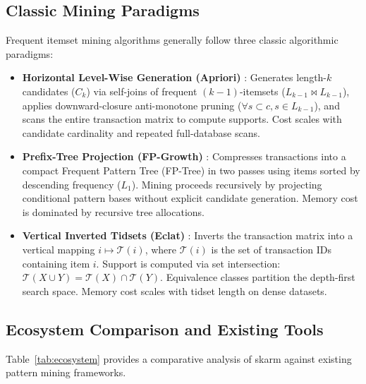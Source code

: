 \documentclass[twocolumn,10pt]{article}
\newcommand{\skarm}{\textsf{skarm}\xspace}
\begin{document}
\subsection{Classic Mining Paradigms}
Frequent itemset mining algorithms generally follow three classic algorithmic paradigms:
\begin{itemize}
  \item \textbf{Horizontal Level-Wise Generation (Apriori)} \cite{agrawal1994}: Generates length-$k$ candidates ($C_k$) via self-joins of frequent $(k-1)$-itemsets ($L_{k-1} \bowtie L_{k-1}$), applies downward-closure anti-monotone pruning ($\forall s \subset c, s \in L_{k-1}$), and scans the entire transaction matrix to compute supports. Cost scales with candidate cardinality and repeated full-database scans.
  \item \textbf{Prefix-Tree Projection (FP-Growth)} \cite{han2000,han2004}: Compresses transactions into a compact Frequent Pattern Tree (FP-Tree) in two passes using items sorted by descending frequency ($L_1$). Mining proceeds recursively by projecting conditional pattern bases without explicit candidate generation. Memory cost is dominated by recursive tree allocations.
  \item \textbf{Vertical Inverted Tidsets (Eclat)} \cite{zaki2000}: Inverts the transaction matrix into a vertical mapping $i \mapsto \mathcal{T}(i)$, where $\mathcal{T}(i)$ is the set of transaction IDs containing item $i$. Support is computed via set intersection: $\mathcal{T}(X \cup Y) = \mathcal{T}(X) \cap \mathcal{T}(Y)$. Equivalence classes partition the depth-first search space. Memory cost scales with tidset length on dense datasets.
\end{itemize}

\subsection{Ecosystem Comparison and Existing Tools}
Table~\ref{tab:ecosystem} provides a comparative analysis of \skarm against existing pattern mining frameworks.
\end{document}
